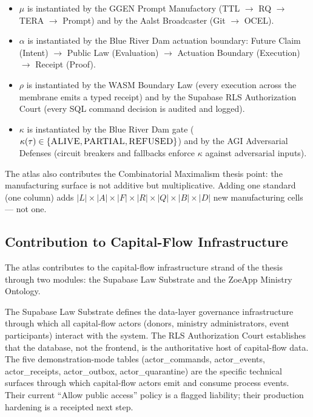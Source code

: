 \begin{itemize}
  \item $\mu$ is instantiated by the GGEN Prompt Manufactory (TTL $\to$ RQ
        $\to$ TERA $\to$ Prompt) and by the Aalst Broadcaster (Git $\to$ OCEL).
  \item $\alpha$ is instantiated by the Blue River Dam actuation boundary:
        Future Claim (Intent) $\to$ Public Law (Evaluation) $\to$ Actuation
        Boundary (Execution) $\to$ Receipt (Proof).
  \item $\rho$ is instantiated by the WASM Boundary Law (every execution across
        the membrane emits a typed receipt) and by the Supabase RLS Authorization
        Court (every SQL command decision is audited and logged).
  \item $\kappa$ is instantiated by the Blue River Dam gate
        ($\kappa(\tau) \in \{\textsc{ALIVE}, \textsc{PARTIAL}, \textsc{REFUSED}\}$)
        and by the AGI Adversarial Defenses (circuit breakers and fallbacks enforce
        $\kappa$ against adversarial inputs).
\end{itemize}

The atlas also contributes the Combinatorial Maximalism thesis point: the
manufacturing surface is not additive but multiplicative. Adding one standard
(one column) adds $|L| \times |A| \times |F| \times |R| \times |Q| \times |B|
\times |D|$ new manufacturing cells --- not one.

\subsection{Contribution to Capital-Flow Infrastructure}
\label{sec:atlas-contribution-capital}

The atlas contributes to the capital-flow infrastructure strand of the thesis
through two modules: the Supabase Law Substrate and the ZoeApp Ministry
Ontology.

The Supabase Law Substrate defines the data-layer governance infrastructure
through which all capital-flow actors (donors, ministry administrators, event
participants) interact with the system. The RLS Authorization Court establishes
that the database, not the frontend, is the authoritative host of capital-flow
data. The five demonstration-mode tables (actor\_commands, actor\_events,
actor\_receipts, actor\_outbox, actor\_quarantine) are the specific technical
surfaces through which capital-flow actors emit and consume process events. Their
current ``Allow public access'' policy is a flagged liability; their production
hardening is a receipted next step.

